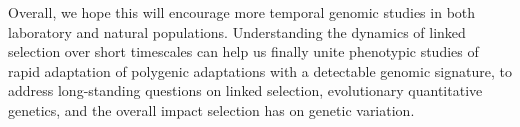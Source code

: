 \documentclass[11pt]{article}
\newcommand{\gc}[1]{{\it \color{red} #1 } }
\DeclareMathOperator{\cov}{Cov}
\begin{document}
Overall, we hope this will encourage more temporal genomic studies in both
laboratory and natural populations. Understanding the dynamics of linked
selection over short timescales can help us finally unite phenotypic studies of
rapid adaptation of polygenic adaptations with a detectable genomic signature,
to address long-standing questions on linked selection, evolutionary
quantitative genetics, and the overall impact selection has on genetic
variation. 











\end{document}
